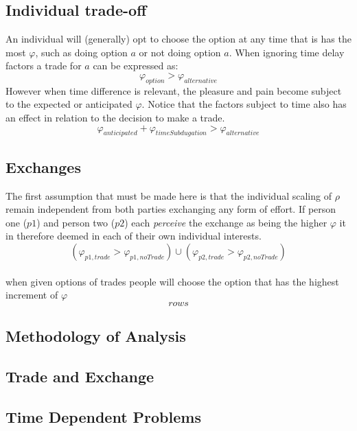 \documentclass[]{article}
\begin{document}
\subsection{Individual trade-off}
An individual will (generally) opt to choose the option at any time that is has the most $\varphi$, such as doing option $a$ or not doing option $a$. When ignoring time delay factors a trade for $a$ can be expressed as:
\begin{equation}\label{ind_trd}
	\varphi_{option} > \varphi_{alternative}
\end{equation}
However when time difference is relevant, the pleasure and pain become subject to the expected or anticipated $\varphi$. Notice that the factors subject to time also has an effect in relation to the decision to make a trade.
\begin{equation}\label{ind_trd_tm}
	\varphi_{anticipated} + \varphi_{timeSubdugation} > \varphi_{alternative}
\end{equation}


\subsection{Exchanges}
The first assumption that must be made here is that the individual scaling of $\rho$ remain independent from both parties exchanging any form of effort. If person one ($p1$) and person two ($p2$) each \textit{perceive} the exchange as being the higher $\varphi$ it in therefore deemed in each of their own individual interests.
\begin{equation}\label{trade_def}
	(\varphi_{p1, trade} > \varphi_{p1, noTrade}) \cup (\varphi_{p2, trade} > \varphi_{p2, noTrade})
\end{equation}\\
when given options of trades people will choose the option that has the highest increment of $\varphi$
\begin{equation}\label{trade_chc}
	rows
\end{equation}


\subsection{Methodology of Analysis}

\subsection{Trade and Exchange}

\subsection{Time Dependent Problems}
\end{document}
